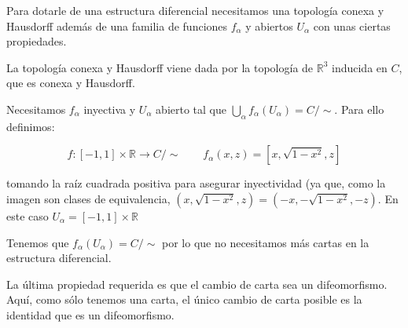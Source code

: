 \begin{problem}[6]
Para dotarle de una estructura diferencial necesitamos una topología conexa y Hausdorff además de una familia de funciones $f_{\alpha}$ y abiertos $U_{\alpha}$ con unas ciertas propiedades.


La topología conexa y Hausdorff viene dada por la topología de $\mathbb{R}^3$ inducida en $C$, que es conexa y Hausdorff.


Necesitamos $f_{\alpha}$ inyectiva y $U_{\alpha}$ abierto tal que $\bigcup_{\alpha} f_{\alpha}(U_{\alpha}) = C/\sim$. Para ello definimos:


\[
f:[-1,1]×ℝ \longrightarrow C/\sim \quad \quad f_{\alpha}(x,z) =\left[x,\sqrt{1-x^2},z\right]
\]

tomando la raíz cuadrada positiva para asegurar inyectividad (ya que, como la imagen son clases de equivalencia, $(x,\sqrt{1-x^2},z) = (-x,-\sqrt{1-x^2},-z)$. En este caso $U_{\alpha} = [-1,1]×ℝ$

Tenemos que $f_{\alpha}(U_{\alpha}) = C/\sim$ por lo que no necesitamos más cartas en la estructura diferencial.


La última propiedad requerida es que el cambio de carta sea un difeomorfismo. Aquí, como sólo tenemos una carta, el único cambio de carta posible es la identidad que es un difeomorfismo.


\end{problem}

